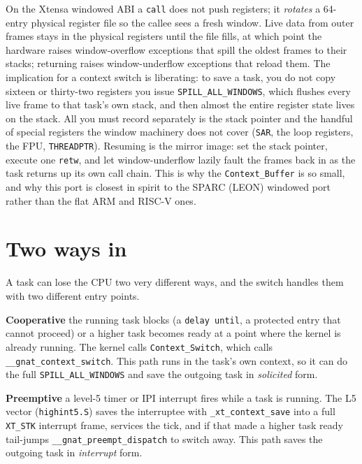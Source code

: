 On the Xtensa windowed ABI a \texttt{call} does not push registers; it
\emph{rotates} a 64-entry physical register file so the callee sees a fresh
window. Live data from outer frames stays in the physical registers until the
file fills, at which point the hardware raises window-overflow exceptions that
spill the oldest frames to their stacks; returning raises window-underflow
exceptions that reload them. The implication for a context switch is liberating:
to save a task, you do not copy sixteen or thirty-two registers \textemdash{} you
issue \texttt{SPILL\_ALL\_WINDOWS}, which flushes every live frame to that task's
own stack, and then almost the entire register state lives on the stack. All you
must record separately is the stack pointer and the handful of special registers
the window machinery does not cover (\texttt{SAR}, the loop registers, the FPU,
\texttt{THREADPTR}). Resuming is the mirror image: set the stack pointer, execute
one \texttt{retw}, and let window-underflow lazily fault the frames back in as the
task returns up its own call chain. This is why the \texttt{Context\_Buffer} is so
small, and why this port is closest in spirit to the SPARC (LEON) windowed port
rather than the flat ARM and RISC-V ones.

\section{Two ways in}

A task can lose the CPU two very different ways, and the switch handles them with
two different entry points.

\textbf{Cooperative} \textemdash{} the running task blocks (a \texttt{delay
until}, a protected entry that cannot proceed) or a higher task becomes ready at
a point where the kernel is already running. The kernel calls
\texttt{Context\_Switch}, which calls \texttt{\_\_gnat\_context\_switch}. This path
runs in the task's own context, so it can do the full \texttt{SPILL\_ALL\_WINDOWS}
and save the outgoing task in \emph{solicited} form.

\textbf{Preemptive} \textemdash{} a level-5 timer or IPI interrupt fires while a
task is running. The L5 vector (\texttt{highint5.S}) saves the interruptee with
\texttt{\_xt\_context\_save} into a full \texttt{XT\_STK} interrupt frame, services
the tick, and \textemdash{} if that made a higher task ready \textemdash{}
tail-jumps \texttt{\_\_gnat\_preempt\_dispatch} to switch away. This path saves the
outgoing task in \emph{interrupt} form.

